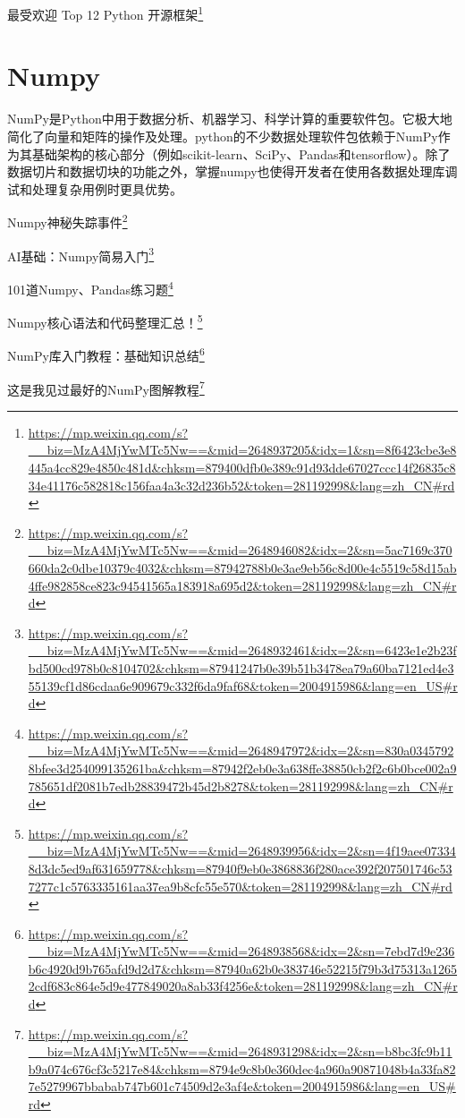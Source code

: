 \documentclass[]{ctexbook}
\renewcommand{\href}[2]{#2\footnote{\url{#1}}}
\begin{document}
\href{https://mp.weixin.qq.com/s?__biz=MzA4MjYwMTc5Nw==\&mid=2648937205\&idx=1\&sn=8f6423cbe3e8445a4cc829e4850c481d\&chksm=879400dfb0e389c91d93dde67027ccc14f26835c834e41176c582818c156faa4a3c32d236b52\&token=281192998\&lang=zh_CN\#rd}{最受欢迎 Top 12 Python 开源框架}

\hypertarget{numpy}{%
\section{Numpy}\label{numpy}}

NumPy是Python中用于数据分析、机器学习、科学计算的重要软件包。它极大地简化了向量和矩阵的操作及处理。python的不少数据处理软件包依赖于NumPy作为其基础架构的核心部分（例如scikit-learn、SciPy、Pandas和tensorflow）。除了数据切片和数据切块的功能之外，掌握numpy也使得开发者在使用各数据处理库调试和处理复杂用例时更具优势。

\href{https://mp.weixin.qq.com/s?__biz=MzA4MjYwMTc5Nw==\&mid=2648946082\&idx=2\&sn=5ac7169c370660da2c0dbe10379c4032\&chksm=87942788b0e3ae9eb56c8d00e4c5519c58d15ab4ffe982858ce823c94541565a183918a695d2\&token=281192998\&lang=zh_CN\#rd}{Numpy神秘失踪事件}

\href{https://mp.weixin.qq.com/s?__biz=MzA4MjYwMTc5Nw==\&mid=2648932461\&idx=2\&sn=6423e1e2b23fbd500cd978b0c8104702\&chksm=87941247b0e39b51b3478ea79a60ba7121ed4e355139cf1d86cdaa6e909679c332f6da9faf68\&token=2004915986\&lang=en_US\#rd}{AI基础：Numpy简易入门}

\href{https://mp.weixin.qq.com/s?__biz=MzA4MjYwMTc5Nw==\&mid=2648947972\&idx=2\&sn=830a03457928bfee3d254099135261ba\&chksm=87942f2eb0e3a638ffe38850cb2f2c6b0bce002a9785651df2081b7edb28839472b45d2b8278\&token=281192998\&lang=zh_CN\#rd}{101道Numpy、Pandas练习题}

\href{https://mp.weixin.qq.com/s?__biz=MzA4MjYwMTc5Nw==\&mid=2648939956\&idx=2\&sn=4f19aee073348d3dc5ed9af631659778\&chksm=87940f9eb0e3868836f280ace392f207501746c537277c1c5763335161aa37ea9b8cfc55e570\&token=281192998\&lang=zh_CN\#rd}{Numpy核心语法和代码整理汇总！}

\href{https://mp.weixin.qq.com/s?__biz=MzA4MjYwMTc5Nw==\&mid=2648938568\&idx=2\&sn=7ebd7d9e236b6c4920d9b765afd9d2d7\&chksm=87940a62b0e383746e52215f79b3d75313a12652cdf683c864e5d9e477849020a8ab33f4256e\&token=281192998\&lang=zh_CN\#rd}{NumPy库入门教程：基础知识总结}

\href{https://mp.weixin.qq.com/s?__biz=MzA4MjYwMTc5Nw==\&mid=2648931298\&idx=2\&sn=b8bc3fc9b11b9a074c676cf3c5217e84\&chksm=8794e9c8b0e360dec4a960a90871048b4a33fa827e5279967bbabab747b601c74509d2e3af4e\&token=2004915986\&lang=en_US\#rd}{这是我见过最好的NumPy图解教程}
\end{document}

